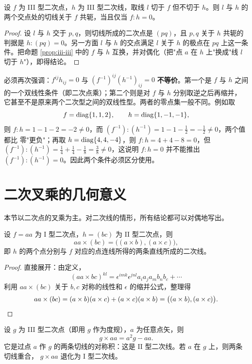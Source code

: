 \begin{proposition}[对偶形式]
设 $f$ 为 III 型二次点，$h$ 为 III 型二次线，取线 $l$ 切于 $f$ 但不切于 $h$。则 $l$ 与 $h$ 的
两个交点处的切线关于 $f$ 共轭，当且仅当 $f:h=0$。
\end{proposition}

\begin{proof}
设 $l$ 与 $h$ 交于 $p,q$，则切线所成的二次点是 $(pq)$，且 $p,q$ 关于 $h$ 共轭的判据是
$h:(pq)=0$。另一方面 $l$ 与 $h$ 的交点满足 $l$ 关于 $h$ 的极点在 $pq$ 上这一条件。把命题
\ref{prop:iii-iii} 中的 $f$ 与 $h$ 互换，并对偶化（把"点 $a$ 在 $h$ 上"换成"线 $l$ 切于
$h$"），即得结论。
\end{proof}

\begin{remark}
必须再次强调：$f^{ij}h_{ij}=0$ 与 $(f^{-1})^{ij}(h^{-1})_{ij}=0$ \textbf{不等价}。第一个是
$f$ 与 $h$ 之间的一个双线性条件（即二次点乘）；第二个则是对 $f$ 与 $h$ 分别取逆之后再缩并，
它甚至不是原来两个二次型之间的双线性型。两者的零点集一般不同。例如取
\[
f=\operatorname{diag}\{1,1,2\},\qquad h=\operatorname{diag}\{1,-1,-1\},
\]
则 $f:h=1-1-2=-2\ne0$，而 $(f^{-1}):(h^{-1})=1-1-\tfrac12=-\tfrac12\ne0$，两个值都比
零"更负"；再取 $h=\operatorname{diag}\{4,4,-4\}$，则
$f:h=4+4-8=0$，但 $(f^{-1}):(h^{-1})=\tfrac14+\tfrac14-\tfrac18=\tfrac38\ne0$，这说明
$f:h=0$ 并不能推出 $(f^{-1}):(h^{-1})=0$。因此两个条件必须区分使用。
\end{remark}

\section{二次叉乘的几何意义}

本节以二次点的叉乘为主。对二次线的情形，所有结论都可以对偶地写出。

\begin{proposition}
设 $f=aa$ 为 I 型二次点，$h=(bc)$ 为 II 型二次点，则
\[
aa\times(bc)=\big((a\times b),(a\times c)\big),
\]
即 $h$ 的两个点分别与 $f$ 对应的点连线所得的两条直线所成的二次线。
\end{proposition}

\begin{proof}
直接展开：由定义，
\[
(aa\times bc)^{kl}=\epsilon^{imk}\epsilon^{jnl}a_ia_ja_mb_nb_c+\cdots
\]
利用 $aa\times(bc)$ 关于 $b,c$ 对称的线性和 $\epsilon$ 的缩并公式，整理得
\[
aa\times(bc)=(a\times b)(a\times c)+(a\times c)(a\times b)=\big((a\times b),(a\times c)\big).\qedhere
\]
\end{proof}

\begin{proposition}
设 $g$ 为 III 型二次点（即用 $g$ 作为度规），$a$ 为任意点矢，则
\[
g\times aa=a^2g-aa .
\]
它是过点 $a$ 作 $g$ 的两条切线的对称积：这是 II 型二次线。若 $a$ 在 $g$ 上，则两条切线重合，
$g\times aa$ 退化为 I 型二次线。
\end{proposition}

